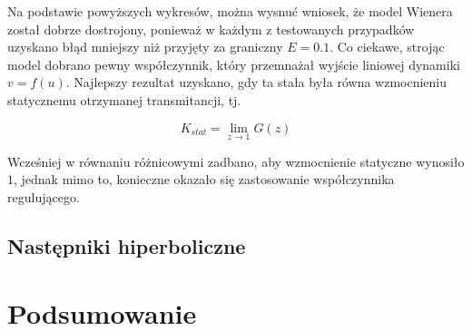 \documentclass[a4paper,titlepage,11pt,floatssmall]{mwrep}
\begin{document}
Na podstawie powyższych wykresów, można wysnuć wniosek, że model Wienera został dobrze dostrojony, ponieważ w każdym z testowanych przypadków uzyskano błąd mniejszy niż przyjęty za graniczny $E = \num{0.1}$. Co ciekawe, strojąc model dobrano pewny współczynnik, który przemnażał wyjście liniowej dynamiki $v = f(u)$. Najlepszy rezultat uzyskano, gdy ta stała była równa wzmocnieniu statycznemu otrzymanej transmitancji, tj.

\begin{equation}
K_{stat} = \lim_{z \to 1} G(z)
\end{equation}

Wcześniej w równaniu różnicowymi zadbano, aby wzmocnienie statyczne wynosiło $1$, jednak mimo to, konieczne okazało się zastosowanie współczynnika regulującego. 

\newpage

\section{Następniki hiperboliczne}

\chapter{Podsumowanie}

\listoffigures
\listoftables
\end{document}
